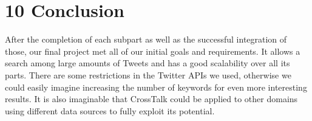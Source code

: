 \chapter*{10    Conclusion}
\setcounter{chapter}{10}
\setcounter{section}{0}

After the completion of each subpart as well as the successful integration of those, our final project met all of our initial goals and requirements. It allows a search among large amounts of Tweets and has a good scalability over all its parts. There are some restrictions in the Twitter APIs we used, otherwise we could easily imagine increasing the number of keywords for even more interesting results. It is also imaginable that CrossTalk could be applied to other domains using different data sources to fully exploit its potential.
